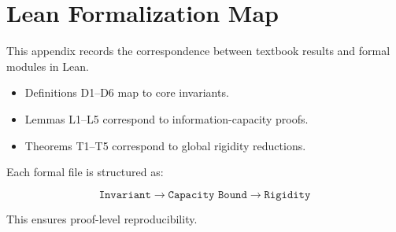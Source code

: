 \appendix
\chapter{Lean Formalization Map}

This appendix records the correspondence between textbook results
and formal modules in Lean.

\begin{itemize}
\item Definitions D1--D6 map to core invariants.
\item Lemmas L1--L5 correspond to information-capacity proofs.
\item Theorems T1--T5 correspond to global rigidity reductions.
\end{itemize}

Each formal file is structured as:

\[
\texttt{Invariant} \rightarrow \texttt{Capacity Bound} \rightarrow \texttt{Rigidity}
\]

This ensures proof-level reproducibility.
